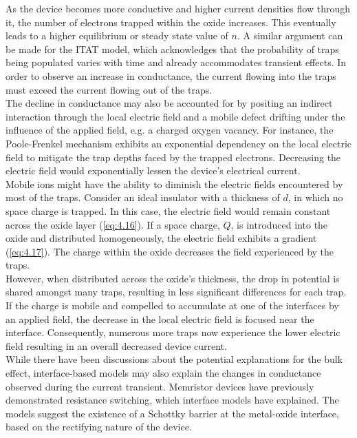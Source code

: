 \noindent As the device becomes more conductive and higher current densities flow through it, the number of electrons trapped within the oxide increases. This eventually leads to a higher equilibrium or steady state value of $n$. A similar argument can be made for the ITAT model, which acknowledges that the probability of traps being populated varies with time and already accommodates transient effects. In order to observe an increase in conductance, the current flowing into the traps must exceed the current flowing out of the traps.\\

\noindent The decline in conductance may also be accounted for by positing an indirect interaction through the local electric field and a mobile defect drifting under the influence of the applied field, e.g. a charged oxygen vacancy. For instance, the Poole-Frenkel mechanism exhibits an exponential dependency on the local electric field to mitigate the trap depths faced by the trapped electrons. Decreasing the electric field would exponentially lessen the device's electrical current.\\

\noindent Mobile ions might have the ability to diminish the electric fields encountered by most of the traps. Consider an ideal insulator with a thickness of $d$, in which no space charge is trapped. In this case, the electric field would remain constant across the oxide layer (\ref{eq:4.16}). If a space charge, $Q$, is introduced into the oxide and distributed homogeneously, the electric field exhibits a gradient (\ref{eq:4.17}). The charge within the oxide decreases the field experienced by the traps.\\

\noindent However, when distributed across the oxide's thickness, the drop in potential is shared amongst many traps, resulting in less significant differences for each trap. If the charge is mobile and compelled to accumulate at one of the interfaces by an applied field, the decrease in the local electric field is focused near the interface. Consequently, numerous more traps now experience the lower electric field resulting in an overall decreased device current.\\

\noindent While there have been discussions about the potential explanations for the bulk effect, interface-based models may also explain the changes in conductance observed during the current transient. Memristor devices have previously demonstrated resistance switching, which interface models have explained. The models suggest the existence of a Schottky barrier at the metal-oxide interface, based on the rectifying nature of the device.\\

